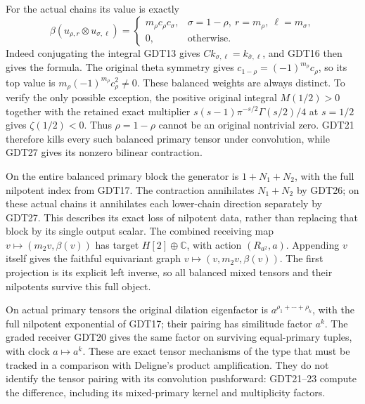 For the actual chains its value is exactly
\begin{equation}\tag{GDT27}
 \beta(u_{\rho,r}\otimes u_{\sigma,\ell})
 =
 \begin{cases}
 m_\rho c_\rho c_\sigma,&
 \sigma=1-\rho,\ r=m_\rho,\ \ell=m_\sigma,\\
 0,&\text{otherwise}.
 \end{cases}
\end{equation}
Indeed conjugating the integral GDT13 gives
$Ck_{\sigma,\ell}=k_{\bar\sigma,\ell}$, and
GDT16 then gives the formula.
The original theta symmetry gives
$c_{1-\rho}=(-1)^{m_\rho}c_\rho$, so its
top value is
$m_\rho(-1)^{m_\rho}c_\rho^2\ne0$.
These balanced weights are always distinct.
To verify the only possible exception, the
positive original integral $M(1/2)>0$ together
with the retained exact multiplier
$s(s-1)\pi^{-s/2}\Gamma(s/2)/4$ at $s=1/2$
gives $\zeta(1/2)<0$. Thus $\rho=1-\rho$
cannot be an original nontrivial zero.
GDT21 therefore kills every such balanced
primary tensor under convolution, while
GDT27 gives its nonzero bilinear contraction.

On the entire balanced primary block the
generator is $1+N_1+N_2$, with the full
nilpotent index from GDT17.
The contraction annihilates $N_1+N_2$ by GDT26;
on these actual chains it annihilates each
lower-chain direction separately by GDT27.
This describes its exact loss of nilpotent
data, rather than replacing that block by
its single output scalar.
The combined receiving map
$v\mapsto(m_2v,\beta(v))$
has target $H[2]\oplus\mathbb C$, with
action $(R_{a^2},a)$.
Appending $v$ itself gives the faithful
equivariant graph
$v\mapsto(v,m_2v,\beta(v))$.
The first projection is its explicit left
inverse, so all balanced mixed tensors and
their nilpotents survive this full object.

On actual primary tensors the original dilation
eigenfactor is $a^{\rho_1+\cdots+\rho_k}$, with the
full nilpotent exponential of GDT17; their pairing
has similitude factor $a^k$.
The graded receiver GDT20 gives the same factor
on surviving equal-primary tuples, with clock
$a\mapsto a^k$. These are exact tensor mechanisms
of the type that must be tracked in a comparison
with Deligne's product amplification.
They do not identify the tensor pairing with
its convolution pushforward: GDT21--23 compute
the difference, including its mixed-primary
kernel and multiplicity factors.

